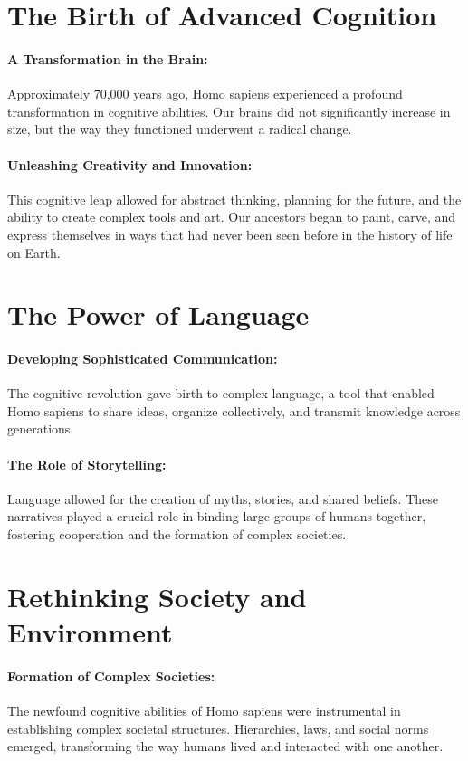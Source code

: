 \documentclass[a4paper,12pt]{book}
\begin{document}
\section*{The Birth of Advanced Cognition}

\paragraph{A Transformation in the Brain:}
Approximately 70,000 years ago, Homo sapiens experienced a profound transformation in cognitive abilities. Our brains did not significantly increase in size, but the way they functioned underwent a radical change.

\paragraph{Unleashing Creativity and Innovation:}
This cognitive leap allowed for abstract thinking, planning for the future, and the ability to create complex tools and art. Our ancestors began to paint, carve, and express themselves in ways that had never been seen before in the history of life on Earth.

\section*{The Power of Language}

\paragraph{Developing Sophisticated Communication:}
The cognitive revolution gave birth to complex language, a tool that enabled Homo sapiens to share ideas, organize collectively, and transmit knowledge across generations.

\paragraph{The Role of Storytelling:}
Language allowed for the creation of myths, stories, and shared beliefs. These narratives played a crucial role in binding large groups of humans together, fostering cooperation and the formation of complex societies.

\section*{Rethinking Society and Environment}

\paragraph{Formation of Complex Societies:}
The newfound cognitive abilities of Homo sapiens were instrumental in establishing complex societal structures. Hierarchies, laws, and social norms emerged, transforming the way humans lived and interacted with one another.
\end{document}
